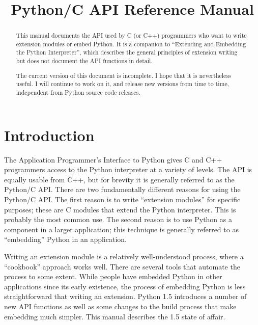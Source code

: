 \documentclass[twoside]{report}
\title{Python/C API Reference Manual}
\begin{document}
\pagestyle{empty}

\maketitle



\begin{abstract}

\noindent
This manual documents the API used by C (or C++) programmers who want
to write extension modules or embed Python.  It is a companion to
``Extending and Embedding the Python Interpreter'', which describes
the general principles of extension writing but does not document the
API functions in detail.

 The current version of this document is incomplete.
I hope that it is nevertheless useful.  I will continue to work on it,
and release new versions from time to time, independent from Python
source code releases.

\end{abstract}

\mytableofcontents



\chapter{Introduction}

The Application Programmer's Interface to Python gives C and C++
programmers access to the Python interpreter at a variety of levels.
The API is equally usable from C++, but for brevity it is generally
referred to as the Python/C API.  There are two fundamentally
different reasons for using the Python/C API.  The first reason is to
write ``extension modules'' for specific purposes; these are C modules
that extend the Python interpreter.  This is probably the most common
use.  The second reason is to use Python as a component in a larger
application; this technique is generally referred to as ``embedding''
Python in an application.

Writing an extension module is a relatively well-understood process, 
where a ``cookbook'' approach works well.  There are several tools 
that automate the process to some extent.  While people have embedded 
Python in other applications since its early existence, the process of 
embedding Python is less straightforward that writing an extension.  
Python 1.5 introduces a number of new API functions as well as some 
changes to the build process that make embedding much simpler.  
This manual describes the 1.5 state of affair.
\end{document}
